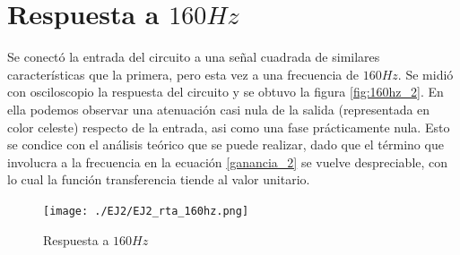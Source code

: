 \section{Respuesta a $160Hz$}

Se conect\'o la entrada del circuito a una se\~nal cuadrada de similares caracter\'isticas que la primera, pero esta vez a una frecuencia de $160Hz$. Se midi\'o con osciloscopio la respuesta del circuito y se obtuvo la figura \ref{fig:160hz_2}. En ella podemos observar una atenuaci\'on casi nula de la salida (representada en color celeste) respecto de la entrada, asi como una fase pr\'acticamente nula. Esto se condice con el an\'alisis te\'orico que se puede realizar, dado que el t\'ermino que involucra a la frecuencia en la ecuaci\'on \ref{ganancia_2} se vuelve despreciable, con lo cual la funci\'on transferencia tiende al valor unitario.

\begin{figure}[H]
    \centering
    \texttt{[image: ./EJ2/EJ2\_rta\_160hz.png]}
    \caption{Respuesta a $160Hz$}
    \label{fig: 160hz_2} 
\end{figure}

